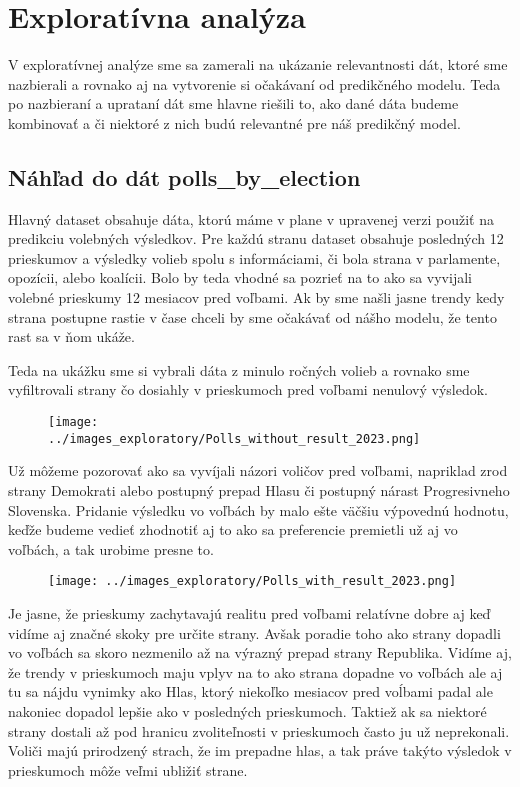 \documentclass[main.tex]{subfiles}
\begin{document}
\section{Exploratívna analýza}
V exploratívnej analýze sme sa zamerali na ukázanie relevantnosti dát, ktoré sme nazbierali a rovnako aj na vytvorenie si očakávaní od predikčného modelu. Teda po nazbieraní a uprataní dát sme hlavne riešili to, ako dané dáta budeme kombinovať a či niektoré z nich budú relevantné pre náš predikčný model.

\subsection{Náhľad do dát polls_by_election}
Hlavný dataset obsahuje dáta, ktorú máme v plane v upravenej verzi použiť na predikciu volebných výsledkov. Pre každú stranu dataset obsahuje posledných 12 prieskumov a výsledky volieb spolu s informáciami, či bola strana v parlamente, opozícii, alebo koalícii. Bolo by teda vhodné sa pozrieť na to ako sa vyvijali volebné prieskumy 12 mesiacov pred voľbami. Ak by sme našli jasne trendy kedy strana postupne rastie v čase chceli by sme očakávať od nášho modelu, že tento rast sa v ňom ukáže. 

Teda na ukážku sme si vybrali dáta z minulo ročných volieb a rovnako sme vyfiltrovali strany čo dosiahly v prieskumoch pred voľbami nenulový výsledok. 
\begin{figure}[!htbp]
    \centering
    \texttt{[image: ../images\_exploratory/Polls\_without\_result\_2023.png]}
    \caption{}
    \label{fig:example}
\end{figure}

Už môžeme pozorovať ako sa vyvíjali názori voličov pred voľbami, napriklad zrod strany Demokrati alebo postupný prepad Hlasu či postupný nárast Progresivneho Slovenska.
Pridanie výsledku vo voľbách by malo ešte väčšiu výpovednú hodnotu, keďže budeme vedieť zhodnotiť aj to ako sa preferencie premietli už aj vo voľbách, a tak urobime presne to.
\begin{figure}[!htbp]
    \centering
    \texttt{[image: ../images\_exploratory/Polls\_with\_result\_2023.png]}
    \caption{}
    \label{fig:example}
\end{figure}

Je jasne, že prieskumy zachytavajú realitu pred voľbami relatívne dobre aj keď vidíme aj značné skoky pre určite strany. Avšak poradie toho ako strany dopadli vo voľbách sa skoro nezmenilo až na výrazný prepad strany Republika.
Vidíme aj, že trendy v prieskumoch maju vplyv na to ako strana dopadne vo voľbách ale aj tu sa nájdu vynimky ako Hlas, ktorý niekoľko mesiacov pred voĺbami padal ale nakoniec dopadol lepšie ako v posledných prieskumoch. Taktiež ak sa niektoré strany dostali až pod hranicu zvoliteľnosti v prieskumoch často ju už neprekonali. Voliči majú prirodzený strach, že im prepadne hlas, a tak práve takýto výsledok v prieskumoch môže veľmi ubližiť strane.
\end{document}
